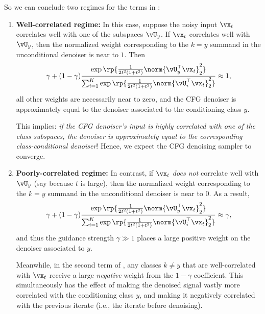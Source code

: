 \documentclass[../../book-main.tex]{subfiles}
\begin{document}
\begin{example}
    So we can conclude two regimes for the terms in
    :
    \begin{enumerate}
        \item \textbf{Well-correlated regime:} In this case, suppose the noisy
            input $\vx_t$ correlates well with one of the subspaces $\vU_y$.
            If $\vx_t$ correlates well with
            $\vU_y$, then the normalized weight corresponding to the
            $k=y$ summand in the unconditional denoiser is near to $1$.
            Then
            \begin{equation}
                \gamma + (1 - \gamma)
                \frac{\exp\rp{\frac{1}{2t^{2}(1
                + t^{2})}\norm{\vU_{y}^{\top}\vx_t}_{2}^{2}}}{\sum_{i
                    = 1}^{K}\exp\rp{\frac{1}{2t^{2}(1
                + t^{2})}\norm{\vU_{i}^{\top}\vx_t}_{2}^{2}}}
                \approx 1,
            \end{equation}
            all other weights are necessarily near to zero, and the CFG denoiser
            is approximately equal to the denoiser associated to the
            conditioning
            class $y$.

            This implies: \textit{if the CFG denoiser's input is highly
                correlated with one of the class subspaces, the denoiser is
                approximately equal to the corresponding class-conditional
            denoiser}! Hence, we expect the CFG denoising sampler to converge.
        \item \textbf{Poorly-correlated regime:} In contrast, if $\vx_t$
            \textit{does not} correlate well with $\vU_y$ (say
            because $t$ is large),
            then the normalized weight corresponding to the $k=y$ summand in the
            unconditional denoiser is near to $0$. As a result,
            \begin{equation}
                \gamma + (1 - \gamma)
                \frac{\exp\rp{\frac{1}{2t^{2}(1
                + t^{2})}\norm{\vU_{y}^{\top}\vx_t}_{2}^{2}}}{\sum_{i
                    = 1}^{K}\exp\rp{\frac{1}{2t^{2}(1
                + t^{2})}\norm{\vU_{i}^{\top}\vx_t}_{2}^{2}}}
                \approx \gamma,
            \end{equation}
            and thus the guidance strength $\gamma \gg 1$ places a
            large positive
            weight on the denoiser associated to $y$.

            Meanwhile, in the second term of
            ,
            any classes $k \neq y$ that are well-correlated with $\vx_t$
            receive a large \textit{negative} weight from the $1 - \gamma$
            coefficient.
            This simultaneously has the effect of making the denoised
            signal vastly
            more correlated with the conditioning class $y$, and
            making it negatively
            correlated with the previous iterate (i.e., the iterate
            before denoising).


\end{enumerate}
\end{example}
\end{document}

